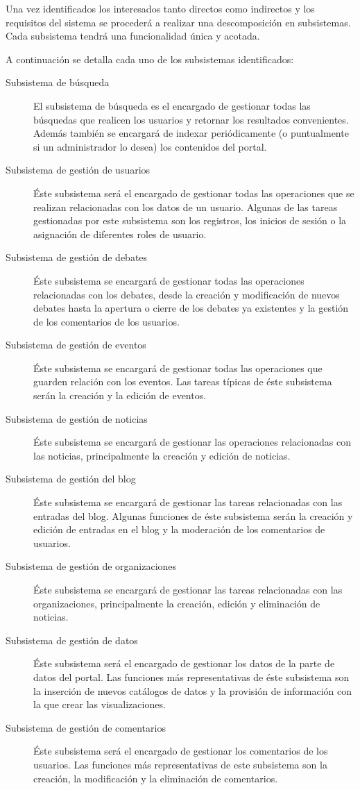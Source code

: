 Una vez identificados los interesados tanto directos como indirectos y los requisitos del sistema se procederá a realizar una descomposición en subsistemas.  Cada subsistema tendrá una funcionalidad única y acotada.

A continuación se detalla cada uno de los subsistemas identificados:

\begin{description}
\item[Subsistema de búsqueda]  El subsistema de búsqueda es el encargado de gestionar todas las búsquedas que realicen los usuarios y retornar los resultados convenientes.  Además también se encargará de indexar periódicamente (o puntualmente si un administrador lo desea) los contenidos del portal.
\item[Subsistema de gestión de usuarios]  Éste subsistema será el encargado de gestionar todas las operaciones que se realizan relacionadas con los datos de un usuario.  Algunas de las tareas gestionadas por este subsistema son los registros, los inicios de sesión o la asignación de diferentes roles de usuario.
\item[Subsistema de gestión de debates]  Éste subsistema se encargará de gestionar todas las operaciones relacionadas con los debates, desde la creación y modificación de nuevos debates hasta la apertura o cierre de los debates ya existentes y la gestión de los comentarios de los usuarios.
\item[Subsistema de gestión de eventos]  Éste subsistema se encargará de gestionar todas las operaciones que guarden relación con los eventos.  Las tareas típicas de éste subsistema serán la creación y la edición de eventos.
\item[Subsistema de gestión de noticias]  Éste subsistema se encargará de gestionar las operaciones relacionadas con las noticias, principalmente la creación y edición de noticias.
\item[Subsistema de gestión del blog]  Éste subsistema se encargará de gestionar las tareas relacionadas con las entradas del blog.  Algunas funciones de éste subsistema serán la creación y edición de entradas en el blog y la moderación de los comentarios de usuarios.
\item[Subsistema de gestión de organizaciones]  Éste subsistema se encargará de gestionar las tareas relacionadas con las organizaciones, principalmente la creación, edición y eliminación de noticias.
\item[Subsistema de gestión de datos]  Éste subsistema será el encargado de gestionar los datos de la parte de datos del portal.  Las funciones más representativas de éste subsistema son la inserción de nuevos catálogos de datos y la provisión de información con la que crear las visualizaciones.
\item[Subsistema de gestión de comentarios]  Éste subsistema será el encargado de gestionar los comentarios de los usuarios.  Las funciones más representativas de este subsistema son la creación, la modificación y la eliminación de comentarios.
\end{description}

